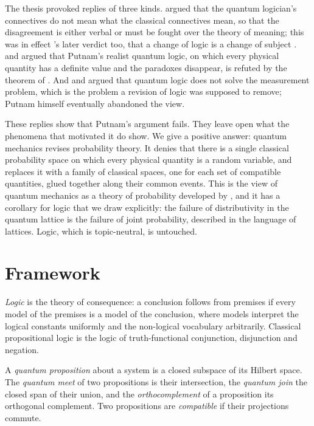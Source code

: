 \documentclass{situationist-preprint}
\begin{document}
The thesis provoked replies of three kinds. \citet{Dummett1976} argued that the quantum logician's connectives do not mean what the classical connectives mean, so that the disagreement is either verbal or must be fought over the theory of meaning; this was in effect \citeauthor{Quine1970}'s later verdict too, that a change of logic is a change of subject \citep{Quine1970}. \citet{Stairs1983} and \citet{Gibbins1987} argued that Putnam's realist quantum logic, on which every physical quantity has a definite value and the paradoxes disappear, is refuted by the theorem of \citet{KochenSpecker1967}. And \citet{Maudlin2005} and \citet{Bacciagaluppi2009} argued that quantum logic does not solve the measurement problem, which is the problem a revision of logic was supposed to remove; Putnam himself eventually abandoned the view.

These replies show that Putnam's argument fails. They leave open what the phenomena that motivated it do show. We give a positive answer: quantum mechanics revises probability theory. It denies that there is a single classical probability space on which every physical quantity is a random variable, and replaces it with a family of classical spaces, one for each set of compatible quantities, glued together along their common events. This is the view of quantum mechanics as a theory of probability developed by \citet{Pitowsky2006}, and it has a corollary for logic that we draw explicitly: the failure of distributivity in the quantum lattice is the failure of joint probability, described in the language of lattices. Logic, which is topic-neutral, is untouched.

\section{Framework}

\begin{definition}\label{d:logic}
\emph{Logic} is the theory of consequence: a conclusion follows from premises if every model of the premises is a model of the conclusion, where models interpret the logical constants uniformly and the non-logical vocabulary arbitrarily. Classical propositional logic is the logic of truth-functional conjunction, disjunction and negation.
\end{definition}

\begin{definition}\label{d:qprop}
A \emph{quantum proposition} about a system is a closed subspace of its Hilbert space. The \emph{quantum meet} of two propositions is their intersection, the \emph{quantum join} the closed span of their union, and the \emph{orthocomplement} of a proposition its orthogonal complement. Two propositions are \emph{compatible} if their projections commute.
\end{definition}
\end{document}
